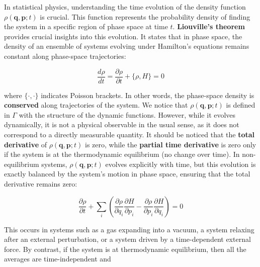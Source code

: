 \documentclass[12pt,a4paper]{report}
\newcommand{\esp}{\vspace{0.5cm}}
\begin{document}
	\esp
	
	In statistical physics, understanding the time evolution of the density function $\rho(\mathbf{q}, \mathbf{p}; t)$ is crucial. This function represents the probability density of finding the system in a specific region of phase space at time $t$. \textbf{Liouville’s theorem} provides crucial insights into this evolution. It states that in phase space, the density of an ensemble of systems evolving under Hamilton’s equations remains constant along phase-space trajectories:
	
	\esp
	
	\begin{equation}
		\frac{d\rho}{dt} = \frac{\partial\rho}{\partial t} + \{ \rho, H \} = 0
	\end{equation}
	
	\esp
	
	where $\{ \cdot, \cdot \}$ indicates Poisson brackets. In other words, the phase-space density is \textbf{conserved} along trajectories of the system. We notice that $\rho(\mathbf{q}, \mathbf{p}; t)$ is defined in $\Gamma$ with the structure of the dynamic functions. However, while it evolves dynamically, it is not a physical observable in the usual sense, as it does not correspond to a directly measurable quantity. It should be noticed that the \textbf{total derivative} of $\rho(\mathbf{q}, \mathbf{p}; t)$ is zero, while the \textbf{partial time derivative} is zero only if the system is at the thermodynamic equilibrium (no change over time). In non-equilibrium systems, $\rho(\mathbf{q}, \mathbf{p}; t)$ evolves explicitly with time, but this evolution is exactly balanced by the system’s motion in phase space, ensuring that the total derivative remains zero:
	
	\esp
	
	\begin{equation}
		\frac{\partial\rho}{\partial t} + \sum_i \left( \frac{\partial\rho}{\partial q_i} \frac{\partial H}{\partial p_i} - \frac{\partial\rho}{\partial p_i} \frac{\partial H}{\partial q_i} \right) = 0
	\end{equation}
	
	\esp
	
	This occurs in systems such as a gas expanding into a vacuum, a system relaxing after an external perturbation, or a system driven by a time-dependent external force. By contrast, if the system is at thermodynamic equilibrium, then all the averages are time-independent and
	
	\esp
	
\end{document}
